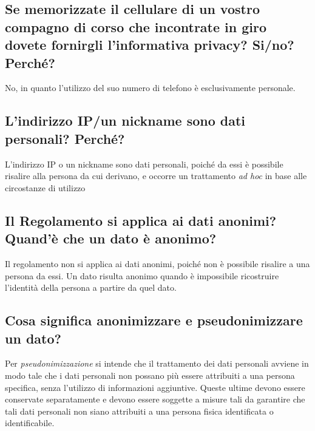 \subsection{Se memorizzate il cellulare di un vostro compagno di corso che incontrate in giro dovete fornirgli
l’informativa privacy? Si/no? Perché?}
No, in quanto l'utilizzo del suo numero di telefono è esclusivamente personale.

\subsection{L'indirizzo IP/un nickname sono dati personali? Perché?}
L'indirizzo IP o un nickname sono dati personali, poiché da essi è possibile
risalire alla persona da cui derivano, e occorre un trattamento \textit{ad hoc}
in base alle circostanze di utilizzo

\subsection{Il Regolamento si applica ai dati anonimi? Quand'è che un dato è anonimo?}
Il regolamento non si applica ai dati anonimi, poiché non è possibile risalire a una persona da essi.
Un dato risulta anonimo quando è impossibile ricostruire l'identità della persona a partire da quel dato.

\subsection{Cosa significa anonimizzare e pseudonimizzare un dato?}
Per \textit{pseudonimizzazione} si intende che il trattamento dei dati
personali avviene in modo tale che i dati personali non possano più essere
attribuiti a una persona specifica, senza l'utilizzo di informazioni
aggiuntive. Queste ultime devono essere conservate separatamente e devono
essere soggette a misure tali da garantire che tali dati personali non siano
attribuiti a una persona fisica identificata o identificabile.

